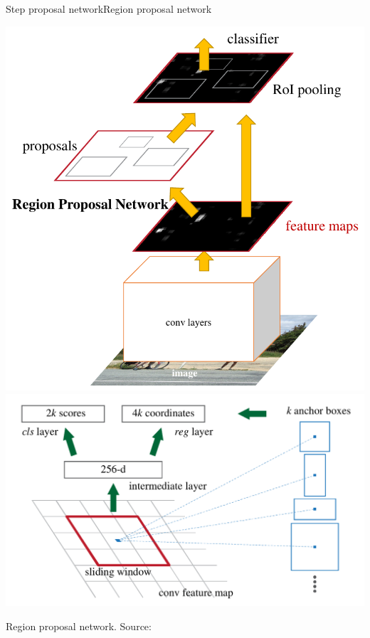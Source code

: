 \documentclass[8pt,t,aspectratio=1610]{beamer}
\newcommand{\ratio}{0.5}
\begin{document}
\begin{frame}[noframenumbering]{Step proposal network}{Region proposal network}
\begin{minipage}[t]{0.54\linewidth}
\renewcommand{\ratio}{0.45}
    \centering
    \includegraphics[width=0.35\linewidth]{faster_rnn_wholenetwork.png}
    \includegraphics[width=0.50\linewidth]{faster_rnn_rpn.png}\\
    \smallskip
    \centerline{\small Region proposal network. Source: \citet{ren2015faster}}

\end{minipage}

\end{frame}
\end{document}
